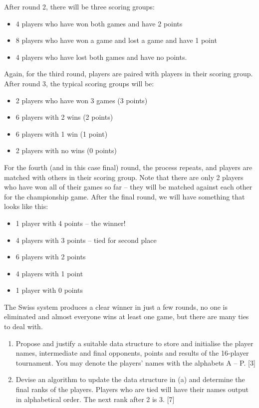 After round 2, there will be three scoring groups: 
\begin{itemize}
\item 4 players who have won both games and have 2 points 
\item 8 players who have won a game and lost a game and have 1 point
\item 4 players who have lost both games and have no points. 
\end{itemize}
Again, for the third round, players are paired with players in their
scoring group. After round 3, the typical scoring groups will be: 
\begin{itemize}
\item 2 players who have won 3 games (3 points) 
\item 6 players with 2 wins (2 points) 
\item 6 players with 1 win (1 point) 
\item 2 players with no wins (0 points) 
\end{itemize}
For the fourth (and in this case final) round, the process repeats,
and players are matched with others in their scoring group. Note that
there are only 2 players who have won all of their games so far --
they will be matched against each other for the \textquotedbl championship\textquotedbl{}
game. After the final round, we will have something that looks like
this: 
\begin{itemize}
\item 1 player with 4 points -- the winner! 
\item 4 players with 3 points -- tied for second place
\item 6 players with 2 points 
\item 4 players with 1 point 
\item 1 player with 0 points 
\end{itemize}
The Swiss system produces a clear winner in just a few rounds, no
one is eliminated and almost everyone wins at least one game, but
there are many ties to deal with. 
\begin{enumerate}
\item Propose and justify a suitable data structure to store and initialise
the player names, intermediate and final opponents, points and results
of the 16-player tournament. You may denote the players' names with
the alphabets A -- P. \hfill{} {[}3{]}
\item Devise an algorithm to update the data structure in (a) and determine
the final ranks of the players. Players who are tied will have their
names output in alphabetical order. The next rank after 2 is 3. \hfill{}{[}7{]}
\end{enumerate}